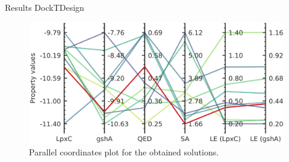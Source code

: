 \documentclass[aspectratio=169,xcolor=dvipsnames]{beamer}
\begin{document}



\begin{frame}{Results \hfill {\footnotesize \alert{DockTDesign}}}
    \begin{figure}
        \centering
        \includegraphics[width=.8\textwidth]{imgs/results/parallel-coords-lpxc-gsha.png}
        \caption{Parallel coordinates plot for the obtained solutions.}
    \end{figure}
\end{frame}


\end{document}
